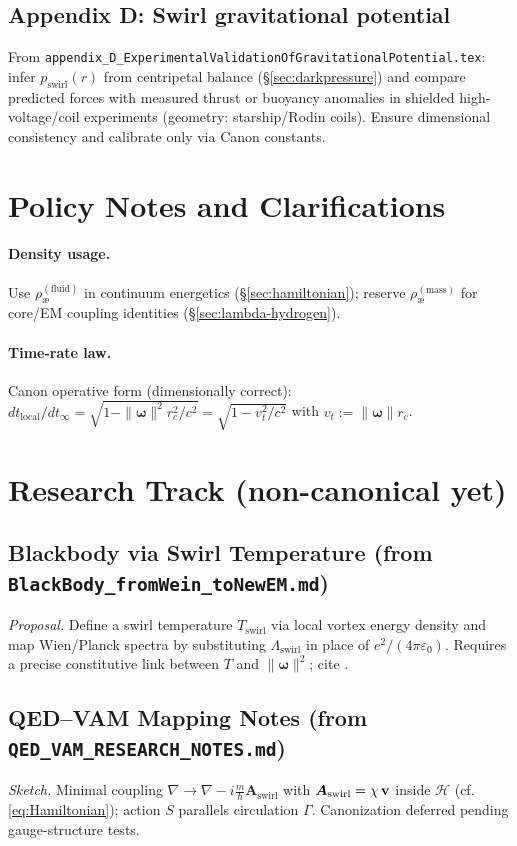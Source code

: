\documentclass[11pt]{article}
\newcommand{\aeFluid}{\rho_{\text{\ae}}^{(\text{fluid})}}
\newcommand{\aeMass}{\rho_{\text{\ae}}^{(\text{mass})}}
\newcommand{\rc}{r_c}
\newcommand{\Ham}{\mathcal{H}}
\newcommand{\Lam}{\Lambda_{\text{swirl}}}
\begin{document}
\subsection{Appendix D: Swirl gravitational potential}
From \texttt{appendix\_D\_ExperimentalValidationOfGravitationalPotential.tex}: infer \(p_{\text{swirl}}(r)\) from centripetal balance (\S\ref{sec:darkpressure}) and compare predicted forces with measured thrust or buoyancy anomalies in shielded high-voltage/coil experiments (geometry: starship/Rodin coils). Ensure dimensional consistency and calibrate only via Canon constants.

\section*{Policy Notes and Clarifications}
\paragraph{Density usage.} Use \(\aeFluid\) in continuum energetics (\S\ref{sec:hamiltonian}); reserve \(\aeMass\) for core/EM coupling identities (\S\ref{sec:lambda-hydrogen}).
\paragraph{Time-rate law.} Canon operative form (dimensionally correct): \( dt_{\text{local}}/dt_\infty = \sqrt{1-\|\bm{\omega}\|^2 \rc^2 / c^2} = \sqrt{1-v_t^2/c^2}\) with \(v_t:=\|\bm{\omega}\|\rc\).

\appendix
\section{Research Track (non-canonical yet)}
\subsection{Blackbody via Swirl Temperature (from \texttt{BlackBody\_fromWein\_toNewEM.md})}
\textit{Proposal.} Define a swirl temperature \(T_{\text{swirl}}\) via local vortex energy density and map Wien/Planck spectra by substituting \(\Lam\) in place of \(e^2/(4\pi\varepsilon_0)\). Requires a precise constitutive link between \(T\) and \(\|\bm{\omega}\|^2\); cite \cite{Wien1894,Planck1901}.

\subsection{QED--VAM Mapping Notes (from \texttt{QED\_VAM\_RESEARCH\_NOTES.md})}
\textit{Sketch.} Minimal coupling \(\nabla\!\to\!\nabla - i\frac{m}{\hbar}\bm{A}_{\text{swirl}}\) with \(\bm{A}_{\text{swirl}}=\chi\,\vb v\) inside \(\Ham\) (cf. \eqref{eq:Hamiltonian}); action \(S\) parallels circulation \(\Gamma\). Canonization deferred pending gauge-structure tests.
\end{document}
